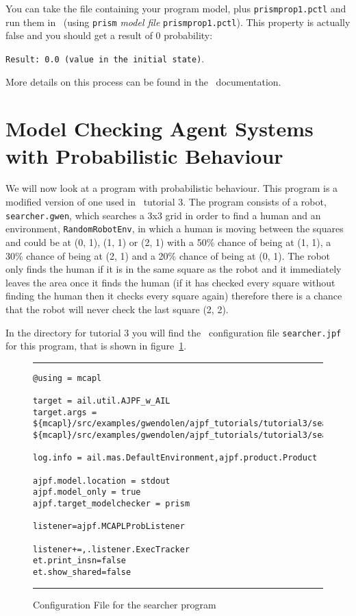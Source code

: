 You can take the file containing  your program model, plus \texttt{prismprop1.pctl} and run them in \prism\ (using \texttt{prism} \emph{model file} \texttt{prismprop1.pctl}).  This property is actually false and you should get a result of 0 probability:

\texttt{Result: 0.0 (value in the initial state)}.

More details on this process can be found in the \prism\ documentation.

\section{Model Checking Agent Systems with Probabilistic Behaviour}

We will now look at a program with probabilistic behaviour.  This program is a modified version of one used in \ail\ tutorial 3. The program consists of a robot, \texttt{searcher.gwen}, which searches a 3x3 grid in order to find a human and an environment, \texttt{RandomRobotEnv}, in which a human is moving between the squares and could be at (0, 1), (1, 1) or (2, 1) with a 50\% chance of being at (1, 1), a 30\% chance of being at (2, 1) and a 20\% chance of being at (0, 1).  The robot only finds the human if it is in the same square as the robot and it immediately leaves the area once it finds the human (if it has checked every square without finding the human then it checks every square again) therefore there is a chance that the robot will never check the last square (2, 2).

In the directory for tutorial 3 you will find the \ajpf\ configuration file \texttt{searcher.jpf} for this program, that is shown in figure~\ref{fig:prism_config2}.

\begin{figure}
\noindent\rule{\textwidth}{1pt}
\begin{small}
\begin{verbatim}
@using = mcapl

target = ail.util.AJPF_w_AIL
target.args = ${mcapl}/src/examples/gwendolen/ajpf_tutorials/tutorial3/searcher.ail,
${mcapl}/src/examples/gwendolen/ajpf_tutorials/tutorial3/searcher.psl,1

log.info = ail.mas.DefaultEnvironment,ajpf.product.Product

ajpf.model.location = stdout
ajpf.model_only = true
ajpf.target_modelchecker = prism

listener=ajpf.MCAPLProbListener

listener+=,.listener.ExecTracker
et.print_insn=false
et.show_shared=false
\end{verbatim}
\end{small}
\noindent\rule{\textwidth}{1pt}
\caption{Configuration File for the searcher program}
\label{fig:prism_config2}
\end{figure}

